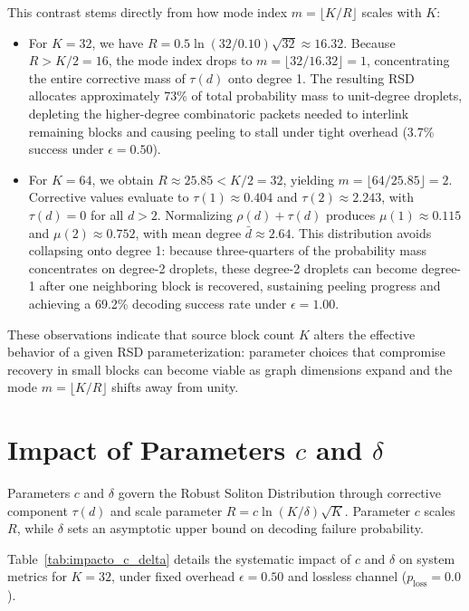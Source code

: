 This contrast stems directly from how mode index $m = \lfloor K/R \rfloor$ scales with $K$:
\begin{itemize}
    \item For $K = 32$, we have $R = 0.5 \ln(32/0.10)\sqrt{32} \approx 16.32$. Because $R > K/2 = 16$, the mode index drops to $m = \lfloor 32 / 16.32 \rfloor = 1$, concentrating the entire corrective mass of $\tau(d)$ onto degree 1. The resulting RSD allocates approximately 73\% of total probability mass to unit-degree droplets, depleting the higher-degree combinatoric packets needed to interlink remaining blocks and causing peeling to stall under tight overhead (3.7\% success under $\epsilon = 0.50$).
    \item For $K = 64$, we obtain $R \approx 25.85 < K/2 = 32$, yielding $m = \lfloor 64 / 25.85 \rfloor = 2$. Corrective values evaluate to $\tau(1) \approx 0.404$ and $\tau(2) \approx 2.243$, with $\tau(d) = 0$ for all $d > 2$. Normalizing $\rho(d) + \tau(d)$ produces $\mu(1) \approx 0.115$ and $\mu(2) \approx 0.752$, with mean degree $\bar{d} \approx 2.64$. This distribution avoids collapsing onto degree 1: because three-quarters of the probability mass concentrates on degree-2 droplets, these degree-2 droplets can become degree-1 after one neighboring block is recovered, sustaining peeling progress and achieving a 69.2\% decoding success rate under $\epsilon = 1.00$.
\end{itemize}

These observations indicate that source block count $K$ alters the effective behavior of a given RSD parameterization: parameter choices that compromise recovery in small blocks can become viable as graph dimensions expand and the mode $m = \lfloor K/R \rfloor$ shifts away from unity.

\section{Impact of Parameters $c$ and $\delta$}
\label{sec:results_impact_c_delta}

Parameters $c$ and $\delta$ govern the Robust Soliton Distribution through corrective component $\tau(d)$ and scale parameter $R = c \ln(K/\delta)\sqrt{K}$. Parameter $c$ scales $R$, while $\delta$ sets an asymptotic upper bound on decoding failure probability.

Table~\ref{tab:impacto_c_delta} details the systematic impact of $c$ and $\delta$ on system metrics for $K = 32$, under fixed overhead $\epsilon = 0.50$ and lossless channel ($p_{\text{loss}} = 0.0$).

